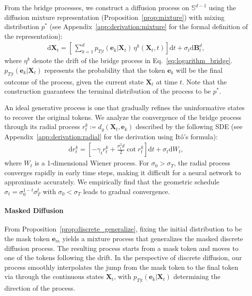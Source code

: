 From the bridge processes, we construct a diffusion process on $\mathbb{S}^{d-1}$ using the diffusion mixture representation (Proposition~\ref{prop:mixture}) with mixing distribution $p^{\ast}$ (see Appendix~\ref{app:derivation:mixture} for the formal definition of the representation):
\begin{align}
    \mathrm{d}\bm{X}_t = \left[ \,
        \sum^d_{k=1} p_{T|t}(\bm{e}_k|\bm{X}_t)\, \eta^{k}(\bm{X}_t,t) 
    \right] \mathrm{d}t + \sigma_t\mathrm{d}\mathbf{B}^{d}_t,
\label{eq:bridge_mixture}
\end{align}
where $\eta^{k}$ denote the drift of the bridge process in Eq.~\eqref{eq:logarithm_bridge}. $p_{T|t}(\bm{e}_k|\bm{X}_t)$ represents the probability that the token $\bm{e}_k$ will be the final outcome of the process, given the current state $\bm{X}_t$ at time $t$.
Note that the construction guarantees the terminal distribution of the process to be $p^{\ast}$.

An ideal generative process is one that gradually refines the uninformative states to recover the original tokens.
We analyze the convergence of the bridge process through its radial process $r^k_t\coloneqq d_g(\bm{X}_t,\bm{e}_k)$ described by the following SDE (see Appendix~\ref{app:derivation:radial} for the derivation using It\^{o}'s formula):
\begin{align}
    \mathrm{d}r^k_t = \left[ -\gamma_t r^k_t + \frac{\sigma^2_td}{2}\cot r^k_t \right]\mathrm{d}t + \sigma_t\mathrm{d}W_t,
\label{eq:}
\end{align}
where $W_t$ is a 1-dimensional Wiener process. 
For $\sigma_0>\sigma_T$, the radial process converges rapidly in early time steps, making it difficult for a neural network to approximate accurately.
We empirically find that the geometric schedule $\sigma_t = \sigma_0^{1-t}\sigma_T^{t}$ with $\sigma_0<\sigma_T$ leads to gradual convergence.



\paragraph{Masked Diffusion}
From Proposition~\ref{prop:discrete_generalize}, fixing the initial distribution to be the mask token $\bm{e}_m$ yields a mixture process that generalizes the masked discrete diffusion process.
The resulting process starts from a mask token and moves to one of the tokens following the drift.
In the perspective of discrete diffusion, our process smoothly interpolates the jump from the mask token to the final token via through the continuous states $\bm{X}_t$, with $p_{T|t}(\bm{e}_k|\bm{X}_t)$ determining the direction of the process.


